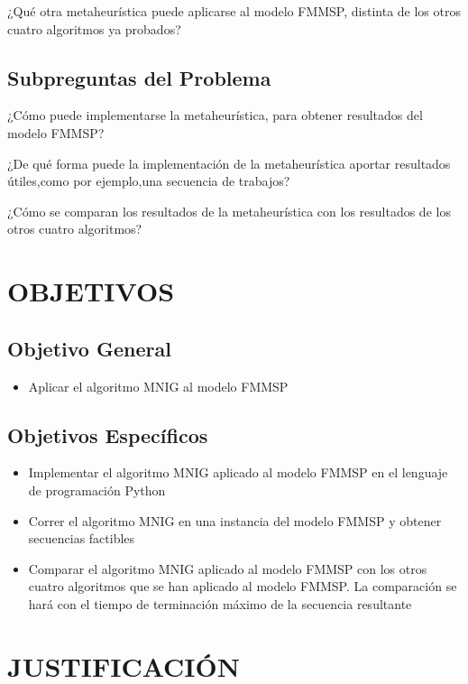 \documentclass{article}
\begin{document}
¿Qué otra metaheurística puede aplicarse al modelo FMMSP, distinta de los otros cuatro algoritmos ya probados?

\subsection{Subpreguntas del Problema}

\indent\indent
¿Cómo puede implementarse la metaheurística, para obtener resultados del modelo FMMSP?

¿De qué forma puede la implementación de la metaheurística aportar resultados útiles,como por ejemplo,una secuencia de trabajos?

¿Cómo se comparan los resultados de la metaheurística con los resultados de los otros cuatro algoritmos?

\section{OBJETIVOS}

\subsection{Objetivo General}

\begin{itemize}
    \item Aplicar el algoritmo MNIG al modelo FMMSP
\end{itemize}

\subsection{Objetivos Específicos}

\begin{itemize}
    \item Implementar el algoritmo MNIG aplicado al modelo FMMSP en el
    \linebreak lenguaje de programación Python
    \item Correr el algoritmo MNIG en una instancia del modelo FMMSP y
    obtener secuencias factibles
    \item Comparar el algoritmo MNIG aplicado al modelo FMMSP con los otros
    cuatro algoritmos que se han aplicado al modelo FMMSP. La comparación se
    hará con el tiempo de terminación máximo de la secuencia resultante
\end{itemize}

\section{JUSTIFICACIÓN}
\end{document}
